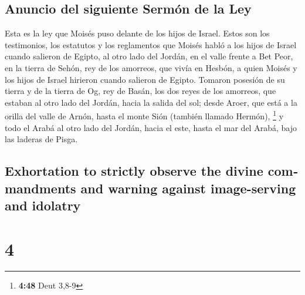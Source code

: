 \begin{paracol}{2}
\hypertarget{anuncio-del-siguiente-sermuxf3n-de-la-ley}{%
\subsection{Anuncio del siguiente Sermón de la
Ley}\label{anuncio-del-siguiente-sermuxf3n-de-la-ley}}

 Esta es la ley que Moisés puso delante de los hijos de
Israel.  Estos son los testimonios, los estatutos y los
reglamentos que Moisés habló a los hijos de Israel cuando salieron de
Egipto,  al otro lado del Jordán, en el valle frente a
Bet Peor, en la tierra de Sehón, rey de los amorreos, que vivía en
Hesbón, a quien Moisés y los hijos de Israel hirieron cuando salieron de
Egipto.  Tomaron posesión de su tierra y de la tierra de
Og, rey de Basán, los dos reyes de los amorreos, que estaban al otro
lado del Jordán, hacia la salida del sol;  desde Aroer,
que está a la orilla del valle de Arnón, hasta el monte Sión (también
llamado Hermón), \footnote{\textbf{4:48} Deut 3,8-9}  y
todo el Arabá al otro lado del Jordán, hacia el este, hasta el mar del
Arabá, bajo las laderas de Pisga.

\switchcolumn
\begin{otherlanguage}{english}

\hypertarget{exhortation-to-strictly-observe-the-divine-commandments-and-warning-against-image-serving-and-idolatry}{%
\subsection{Exhortation to strictly observe the divine commandments and
warning against image-serving and
idolatry}\label{exhortation-to-strictly-observe-the-divine-commandments-and-warning-against-image-serving-and-idolatry}}

\hypertarget{section-7}{%
\section{4}\label{section-7}}


\end{otherlanguage}
\end{paracol}
